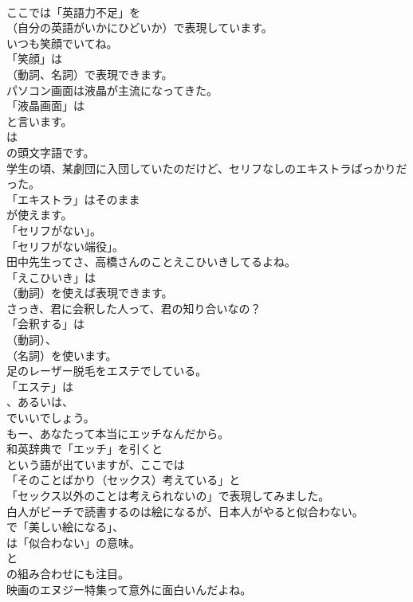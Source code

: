 \documentclass[8pt]{extreport}
\begin{document}
\begin{CJK}{UTF8}{min}
\\	ここでは「英語力不足」を
\\	（自分の英語がいかにひどいか）で表現しています。	
\\	いつも笑顔でいてね。 
\\	「笑顔」は 
\\	（動詞、名詞）で表現できます。	
\\	パソコン画面は液晶が主流になってきた。 
\\	「液晶画面」は 
\\	と言います。
\\	は 
\\	の頭文字語です。	
\\	学生の頃、某劇団に入団していたのだけど、セリフなしのエキストラばっかりだった。 
\\	「エキストラ」はそのまま
\\	が使えます。
\\	「セリフがない」。
\\	「セリフがない端役」。	
\\	田中先生ってさ、高橋さんのことえこひいきしてるよね。 
\\	「えこひいき」は
\\	（動詞）を使えば表現できます。	
\\	さっき、君に会釈した人って、君の知り合いなの？ 
\\	「会釈する」は
\\	（動詞）、
\\	（名詞）を使います。	
\\	足のレーザー脱毛をエステでしている。 
\\	「エステ」は 
\\	、あるいは、
\\	でいいでしょう。	
\\	もー、あなたって本当にエッチなんだから。 
\\	和英辞典で「エッチ」を引くと
\\	という語が出ていますが、ここでは
\\	「そのことばかり（セックス）考えている」と
\\	「セックス以外のことは考えられないの」で表現してみました。	
\\	白人がビーチで読書するのは絵になるが、日本人がやると似合わない。 
\\	で「美しい絵になる」、
\\	は「似合わない」の意味。
\\	と 
\\	の組み合わせにも注目。	
\\	映画のエヌジー特集って意外に面白いんだよね。 

\end{CJK}
\end{document}

